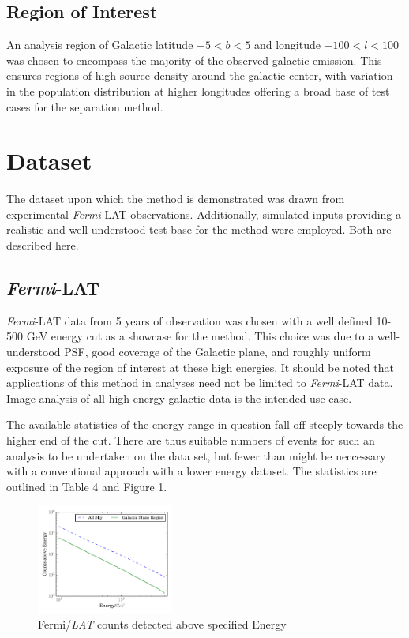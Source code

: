 \documentclass{PoS}
\begin{document}
\subsection{Region of Interest}

An analysis region of Galactic latitude $-5 < b < 5$ and longitude $-100 < l < 100$ was chosen to encompass the majority of the observed galactic emission. This ensures regions of high source density around the galactic center, with variation in the population distribution at higher longitudes offering a broad base of test cases for the separation method.


\section{Dataset}

The dataset upon which the method is demonstrated was drawn from experimental \textit{Fermi}-LAT observations. Additionally, simulated inputs providing a realistic and well-understood test-base for the method were employed. Both are described here.

\subsection{\textit{Fermi}-LAT}

\textit{Fermi}-LAT data from 5 years of observation was chosen with a well defined 10-500 GeV energy cut as a showcase for the method. This choice was due to a well-understood PSF, good coverage of the Galactic plane, and roughly uniform exposure of the region of interest at these high energies. It should be noted that applications of this method in analyses need not be limited to \textit{Fermi}-LAT data. Image analysis of all high-energy galactic data is the intended use-case.

The available statistics of the energy range in question fall off steeply towards the higher end of the cut. There are thus suitable numbers of events for such an analysis to be undertaken on the data set, but fewer than might be neccessary with a conventional approach with a lower energy dataset. The statistics are outlined in Table 4 and Figure 1.

\begin{figure}
\vspace{-30pt}
  \begin{center}
      \includegraphics[width=0.4\textwidth]{figures/counts.pdf}
  \caption{Fermi/\textit{LAT} counts detected above specified Energy}
  \end{center}
  \vspace{-30pt}
\end{figure}
\end{document}
